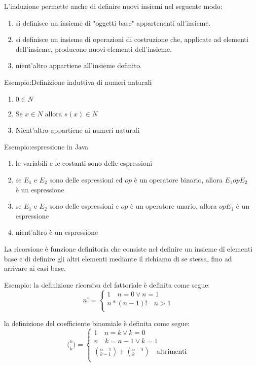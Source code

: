 \documentclass[a4paper]{report}
\begin{document}
L'induzione permette anche di definire nuovi insiemi nel seguente modo:
\begin{enumerate}
  \item si definisce un insieme di "oggetti base" appartenenti all'insieme.
  \item si definisce un insieme di operazioni di costruzione che, applicate ad elementi
        dell'insieme, producono nuovi elementi dell'insieme.
  \item nient'altro appartiene all'insieme definito.
\end{enumerate}

Esempio:Definizione induttiva di numeri naturali\newline
\begin{enumerate}
  \item $0 \in N$
  \item Se $x \in N$ allora $s(x) \in N$
  \item Nient'altro appartiene ai numeri naturali
\end{enumerate}

Esempio:espressione in Java
\begin{enumerate}
    \item le variabili e le costanti sono delle espressioni
    \item se $E_1$ e $E_2$ sono delle espressioni ed $op$ è un operatore binario,
          allora $E_1 op E_2$ è un espressione
    \item se $E_1$ e $E_2$ sono delle espressioni e $op$ è un operatore unario,
          allora $op E_1$ è un espressione
    \item nient'altro è un espressione
\end{enumerate}

La ricorsione è funzione definitoria che consiste nel definire un insieme
di elementi base e di definire gli altri elementi mediante il richiamo di se stessa,
fino ad arrivare ai casi base.

Esempio:
la definizione ricorsiva del fattoriale è definita come segue:
\begin{equation*}
    n! = \begin{cases} 1 \quad n = 0 \lor n = 1 \\ n * (n-1)! \quad n > 1\\
\end{cases}
\end{equation*}

la definizione del coefficiente binomiale è definita come segue:
\begin{equation*}
    \bigl( ^ n _ k \bigr) = \begin{cases} 1 \quad n = k \lor k = 0 \\
                             n \quad k = n-1 \lor k = 1 \\
                             (^{n-1} _{k-1}) + (^{n-1} _k) \quad \text{altrimenti} \\
                \end{cases}
\end{equation*}
\end{document}
